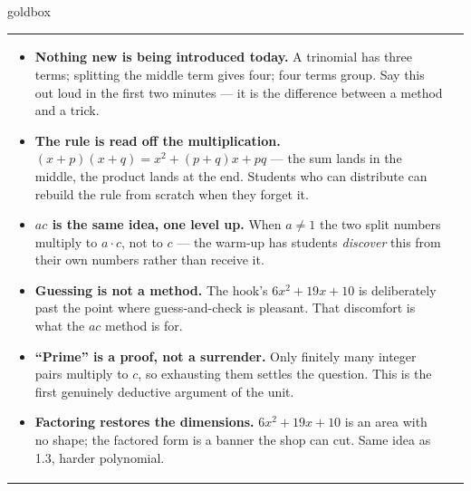 \documentclass[10pt]{article}
\begin{document}
\begin{skillbox}{goldbox}
\begin{tabularx}{\linewidth}{@{}X|X@{}}
\begin{minipage}[t]{\linewidth}
\begin{itemize}[leftmargin=1.1em, itemsep=2pt, topsep=2pt]
  \item \textbf{Nothing new is being introduced today.} A trinomial has three terms; splitting the
        middle term gives four; four terms group. Say this out loud in the first two minutes --- it
        is the difference between a method and a trick.
  \item \textbf{The rule is read off the multiplication.} $(x+p)(x+q)=x^2+(p+q)x+pq$ --- the sum
        lands in the middle, the product lands at the end. Students who can distribute can rebuild
        the rule from scratch when they forget it.
  \item \textbf{$ac$ is the same idea, one level up.} When $a \ne 1$ the two split numbers multiply
        to $a \cdot c$, not to $c$ --- the warm-up has students \emph{discover} this from their own
        numbers rather than receive it.
  \item \textbf{Guessing is not a method.} The hook's $6x^2+19x+10$ is deliberately past the point
        where guess-and-check is pleasant. That discomfort is what the $ac$ method is for.
  \item \textbf{``Prime'' is a proof, not a surrender.} Only finitely many integer pairs multiply
        to $c$, so exhausting them settles the question. This is the first genuinely deductive
        argument of the unit.
  \item \textbf{Factoring restores the dimensions.} $6x^2+19x+10$ is an area with no shape; the
        factored form is a banner the shop can cut. Same idea as 1.3, harder polynomial.
\end{itemize}
\end{minipage}
\end{tabularx}
\end{skillbox}
\end{document}
